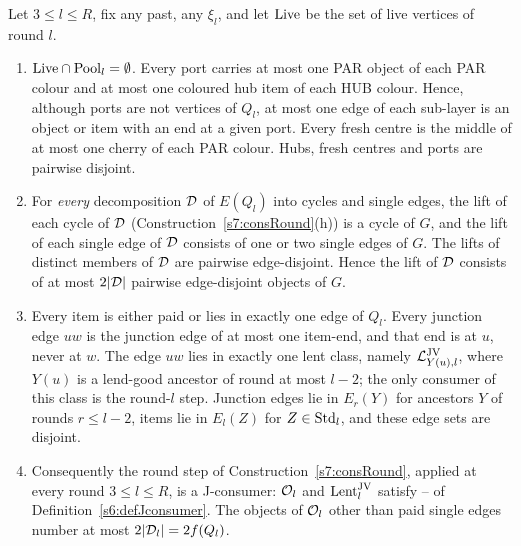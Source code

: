 \begin{lemma}\label{s7:lemLift}
Let $3\le l\le R$, fix any past, any $\xi_l$, and let $\mathrm{Live}$ be the set of live
vertices of round $l$.
\begin{enumerate}
\item[(i)] $\mathrm{Live}\cap\mathrm{Pool}_l=\emptyset$. Every port carries at most one PAR
object of each PAR colour and at most one coloured hub item of each HUB colour.
Hence, although ports are not vertices of $Q_l$, at most one edge of each
sub-layer is an object or item with an end at a given port. Every fresh centre is the middle of at
most one cherry of each PAR colour. Hubs, fresh centres and ports are pairwise
disjoint.
\item[(ii)] For \emph{every} decomposition $\mathcal{D}$ of $E(Q_l)$ into cycles and
single edges, the lift of each cycle of $\mathcal{D}$ (Construction~\ref{s7:consRound}(h))
is a cycle of $G$, and the lift of each single edge of $\mathcal{D}$ consists of one or
two single edges of $G$. The lifts of distinct members of $\mathcal{D}$ are pairwise
edge-disjoint. Hence the lift of $\mathcal{D}$ consists of at most $2|\mathcal{D}|$ pairwise
edge-disjoint objects of $G$.
\item[(iii)] Every item is either paid or lies in exactly one edge of $Q_l$.
Every junction edge $uw$ is the junction edge of at most one item-end, and that
end is at $u$, never at $w$. The edge $uw$ lies in exactly one lent class, namely
$\mathcal{L}^{\mathrm{JV}}_{Y(u),l}$, where $Y(u)$ is a lend-good ancestor of round at most $l-2$; the
only consumer of this class is the round-$l$ step. Junction edges lie in
$E_{r}(Y)$ for ancestors $Y$ of rounds $r\le l-2$, items lie in $E_l(Z)$ for
$Z\in\mathrm{Std}_l$, and these edge sets are disjoint.
\item[(iv)] Consequently the round step of Construction~\ref{s7:consRound},
applied at every round $3\le l\le R$, is a J-consumer:
$\mathcal{O}_l$ and $\mathrm{Lent}^{\mathrm{JV}}_l$ satisfy -- of
Definition~\ref{s6:defJconsumer}. The objects of $\mathcal{O}_l$ other than paid single
edges number at most $2|\mathcal{D}_l|=2f(Q_l)$.
\end{enumerate}
\deps{\ref{s7:consRound}, \ref{s7:lemSimple}, \ref{s7:lemWellDef}, \ref{s6:lemJplus}, \ref{s6:defJconsumer}, \ref{s3:defCOL}, \ref{s2:propStructure}, \ref{s6:defLending}}
\end{lemma}


